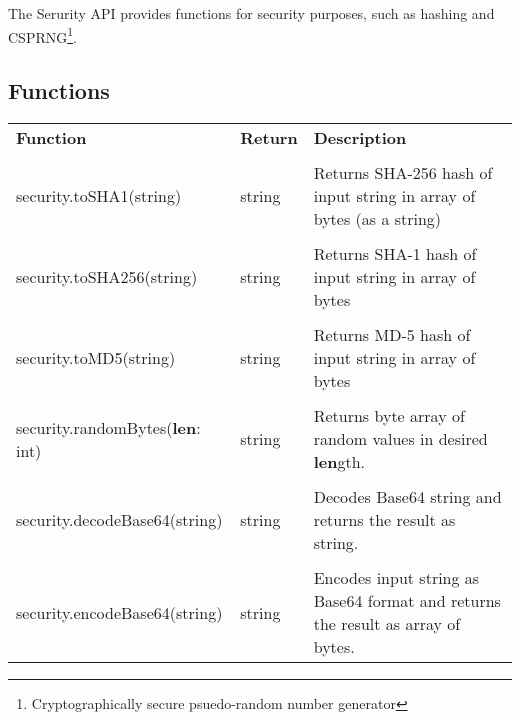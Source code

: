 The Serurity API provides functions for security purposes, such as hashing and CSPRNG\footnote{Cryptographically secure psuedo-random number generator}.

\subsection{Functions}

\begin{tabularx}{\textwidth}{l l X}
	\textbf{\large Function} & \textbf{\large Return} & \textbf{\large Description}
	\\ \\
	\endhead
	security.toSHA1(string) & string & Returns SHA-256 hash of input string in array of bytes (as a string)
	\\ \\
	security.toSHA256(string) & string & Returns SHA-1 hash of input string in array of bytes
		\\ \\
	security.toMD5(string) & string & Returns MD-5 hash of input string in array of bytes
	\\ \\
	security.randomBytes(\textbf{len}: int) & string & Returns byte array of random values in desired \textbf{len}gth.
	\\ \\
	security.decodeBase64(string) & string & Decodes Base64 string and returns the result as string.
	\\ \\
	security.encodeBase64(string) & string & Encodes input string as Base64 format and returns the result as array of bytes.
\end{tabularx}
